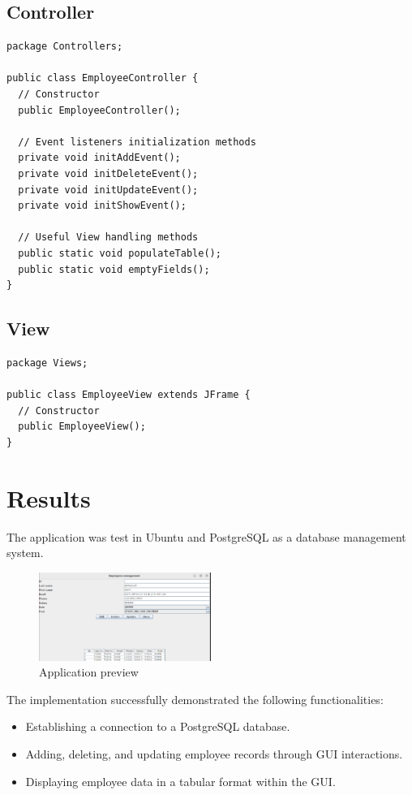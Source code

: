 \documentclass[12pt]{article}
\begin{document}
\subsection{Controller}
\begin{lstlisting}
package Controllers;

public class EmployeeController {
  // Constructor
  public EmployeeController();
  
  // Event listeners initialization methods
  private void initAddEvent();
  private void initDeleteEvent();
  private void initUpdateEvent();
  private void initShowEvent();
  
  // Useful View handling methods
  public static void populateTable();
  public static void emptyFields();
}
\end{lstlisting}

\subsection{View}
\begin{lstlisting}
package Views;

public class EmployeeView extends JFrame {
  // Constructor
  public EmployeeView();
}
\end{lstlisting}

\section{Results}
The application  was test in Ubuntu and PostgreSQL as a database management
system.

\begin{figure}[h]
  \centering
	\includegraphics[width=0.5\textwidth]{preview.png}
  \caption{Application preview}
\end{figure}

The implementation successfully demonstrated the following functionalities:
\begin{itemize}
    \item Establishing a connection to a PostgreSQL database.
    \item Adding, deleting, and updating employee records through GUI
		interactions.
    \item Displaying employee data in a tabular format within the GUI.
\end{itemize}
\end{document}
